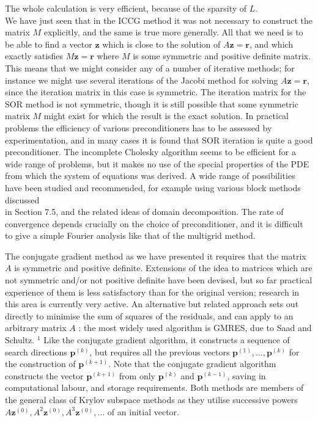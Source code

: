 \documentclass[10pt]{article}
\begin{document}
The whole calculation is very efficient, because of the sparsity of \(L\).\\
We have just seen that in the ICCG method it was not necessary to construct the matrix \(M\) explicitly, and the same is true more generally. All that we need is to be able to find a vector \(\mathbf{z}\) which is close to the solution of \(A \mathbf{z}=\mathbf{r}\), and which exactly satisfies \(M \mathbf{z}=\mathbf{r}\) where \(M\) is some symmetric and positive definite matrix. This means that we might consider any of a number of iterative methods; for instance we might use several iterations of the Jacobi method for solving \(A \mathbf{z}=\mathbf{r}\), since the iteration matrix in this case is symmetric. The iteration matrix for the SOR method is not symmetric, though it is still possible that some symmetric matrix \(M\) might exist for which the result is the exact solution. In practical problems the efficiency of various preconditioners has to be assessed by experimentation, and in many cases it is found that SOR iteration is quite a good preconditioner. The incomplete Cholesky algorithm seems to be efficient for a wide range of problems, but it makes no use of the special properties of the PDE from which the system of equations was derived. A wide range of possibilities have been studied and recommended, for example using various block methods discussed\\
in Section 7.5, and the related ideas of domain decomposition. The rate of convergence depends crucially on the choice of preconditioner, and it is difficult to give a simple Fourier analysis like that of the multigrid method.

The conjugate gradient method as we have presented it requires that the matrix \(A\) is symmetric and positive definite. Extensions of the idea to matrices which are not symmetric and/or not positive definite have been devised, but so far practical experience of them is less satisfactory than for the original version; research in this area is currently very active. An alternative but related approach sets out directly to minimise the sum of squares of the residuals, and can apply to an arbitrary matrix \(A\) : the most widely used algorithm is GMRES, due to Saad and Schultz. \({ }^{1}\) Like the conjugate gradient algorithm, it constructs a sequence of search directions \(\mathbf{p}^{(k)}\), but requires all the previous vectors \(\mathbf{p}^{(1)}, \ldots, \mathbf{p}^{(k)}\) for the construction of \(\mathbf{p}^{(k+1)}\). Note that the conjugate gradient algorithm constructs the vector \(\mathbf{p}^{(k+1)}\) from only \(\mathbf{p}^{(k)}\) and \(\mathbf{p}^{(k-1)}\), saving in computational labour, and storage requirements. Both methods are members of the general class of Krylov subspace methods as they utilise successive powers \(A \mathbf{z}^{(0)}, A^{2} \mathbf{z}^{(0)}, A^{3} \mathbf{z}^{(0)}, \ldots\) of an initial vector.
\end{document}
